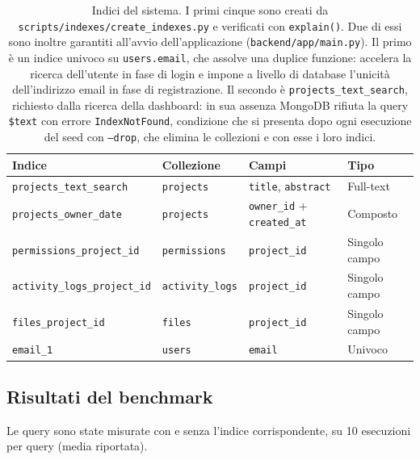 \documentclass[11pt,a4paper]{article}
\begin{document}
\begin{table}[h!]
\centering
\scriptsize
\begin{tabular}{@{}p{4.4cm}p{2.6cm}p{3cm}p{2cm}@{}}
\toprule
\textbf{Indice} & \textbf{Collezione} & \textbf{Campi} & \textbf{Tipo} \\
\midrule
\texttt{projects\_text\_search} & \texttt{projects} & \texttt{title}, \texttt{abstract} & Full-text \\
\texttt{projects\_owner\_date} & \texttt{projects} & \texttt{owner\_id} + \texttt{created\_at} & Composto \\
\texttt{permissions\_project\_id} & \texttt{permissions} & \texttt{project\_id} & Singolo campo \\
\texttt{activity\_logs\_project\_id} & \texttt{activity\_logs} & \texttt{project\_id} & Singolo campo \\
\texttt{files\_project\_id} & \texttt{files} & \texttt{project\_id} & Singolo campo \\
\midrule
\texttt{email\_1} & \texttt{users} & \texttt{email} & Univoco \\
\bottomrule
\end{tabular}
\caption{Indici del sistema. I primi cinque sono creati da \texttt{scripts/indexes/create\_indexes.py} e verificati con \texttt{explain()}. Due di essi sono inoltre garantiti all'avvio dell'applicazione (\texttt{backend/app/main.py}). Il primo è un indice univoco su \texttt{users.email}, che assolve una duplice funzione: accelera la ricerca dell'utente in fase di login e impone a livello di database l'unicità dell'indirizzo email in fase di registrazione. Il secondo è \texttt{projects\_text\_search}, richiesto dalla ricerca della dashboard: in sua assenza MongoDB rifiuta la query \texttt{\$text} con errore \texttt{IndexNotFound}, condizione che si presenta dopo ogni esecuzione del seed con \texttt{--drop}, che elimina le collezioni e con esse i loro indici.}
\end{table}

\newpage

\subsection{Risultati del benchmark}

Le query sono state misurate con e senza l'indice corrispondente, su 10 esecuzioni per query (media riportata).
\end{document}
